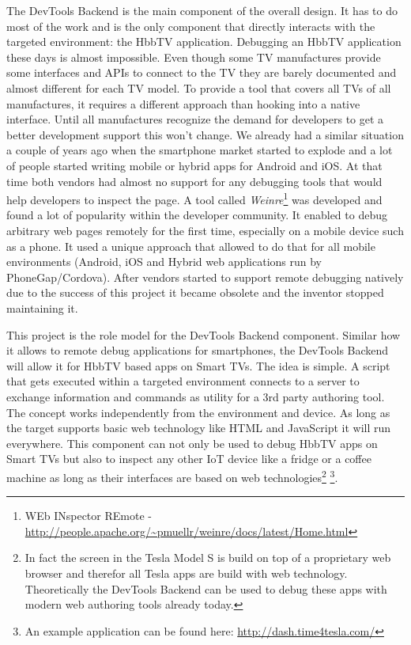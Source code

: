 The DevTools Backend is the main component of the overall design. It has to do most of the work and is the only component that directly interacts with the targeted environment: the HbbTV application. Debugging an HbbTV application these days is almost impossible. Even though some TV manufactures provide some interfaces and APIs to connect to the TV they are barely documented and almost different for each TV model. To provide a tool that covers all TVs of all manufactures, it requires a different approach than hooking into a native interface. Until all manufactures recognize the demand for developers to get a better development support this won't change. We already had a similar situation a couple of years ago when the smartphone market started to explode and a lot of people started writing mobile or hybrid apps for Android and iOS. At that time both vendors had almost no support for any debugging tools that would help developers to inspect the page. A tool called \textit{Weinre}\footnote{WEb INspector REmote - \url{http://people.apache.org/~pmuellr/weinre/docs/latest/Home.html}} was developed and found a lot of popularity within the developer community. It enabled to debug arbitrary web pages remotely for the first time, especially on a mobile device such as a phone. It used a unique approach that allowed to do that for all mobile environments (Android, iOS and Hybrid web applications run by PhoneGap/Cordova). After vendors started to support remote debugging natively due to the success of this project it became obsolete and the inventor stopped maintaining it.

This project is the role model for the DevTools Backend component. Similar how it allows to remote debug applications for smartphones, the DevTools Backend will allow it for HbbTV based apps on Smart TVs. The idea is simple. A script that gets executed within a targeted environment connects to a server to exchange information and commands as utility for a 3rd party authoring tool. The concept works independently from the environment and device. As long as the target supports basic web technology like HTML and JavaScript it will run everywhere. This component can not only be used to debug HbbTV apps on Smart TVs but also to inspect any other IoT device like a fridge or a coffee machine as long as their interfaces are based on web technologies\footnote{In fact the screen in the Tesla Model S is build on top of a proprietary web browser and therefor all Tesla apps are build with web technology. Theoretically the DevTools Backend can be used to debug these apps with modern web authoring tools already today.} \footnote{An example application can be found here: \url{http://dash.time4tesla.com/}}.

